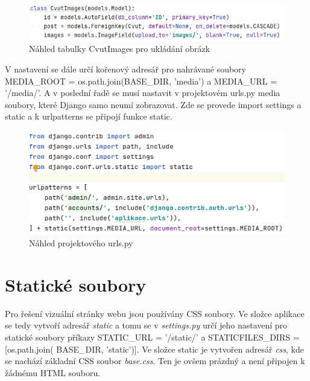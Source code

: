 \begin{figure}[H] \centering
    \includegraphics[width=430pt]{./pictures/9-db-cvutimages.PNG}
    \caption[Náhled tabulky CvutImages pro ukládání obrázků]{Náhled tabulky CvutImages pro ukládání obrázk}
	\label{fig:Náhled tabulky CvutImages pro ukládání obrázk}              
\end{figure}


V nastavení se dále určí kořenový adresář pro nahrávané soubory
MEDIA\_ROOT = os.path.join(BASE\_DIR, 'media') a
MEDIA\_URL = '/media/'.  A v poslední řadě se musí nastavit v
projektovém urls.py media soubory, které Django samo neumí
zobrazovat. Zde se provede import settings a static a k urlpatterns se
připojí funkce static.

\begin{figure}[H] \centering
    \includegraphics[width=380pt]{./pictures/10-media-urlspy.PNG}
    \caption[Náhled projektového urls.py]{Náhled projektového urls.py}
	\label{fig:Náhled projektového urls.py}              
\end{figure}

\newpage

\section{Statické soubory}

Pro řešení vizuální stránky webu jsou používány CSS soubory. Ve složce
aplikace se tedy vytvoří adresář \emph{static} a tomu se v \emph{settings.py} 
určí jeho nastavení pro statické soubory příkazy STATIC\_URL =
  '/static/' a STATICFILES\_DIRS = [os.path.join( BASE\_DIR,
    'static')]. Ve složce static je vytvořen adresář \emph{css}, kde se
nachází základní CSS soubor \emph{base.css}. Ten je ovšem prázdný a není
připojen k žádnému HTML souboru.

